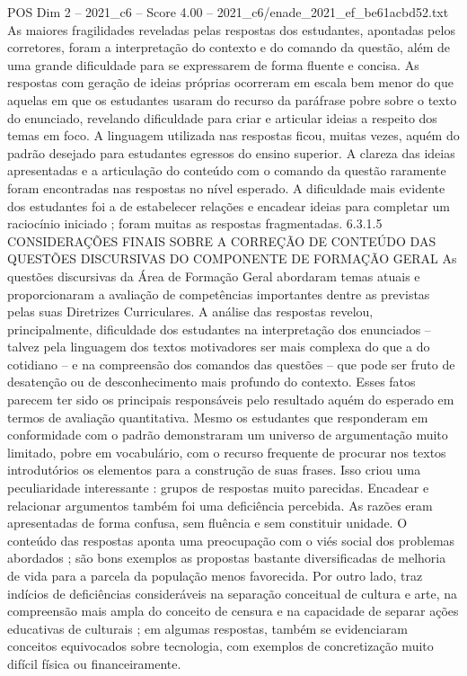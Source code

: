 \begin{textsample}{POS Dim 2 – 2021\_c6 – Score 4.00 – 2021\_c6/enade\_2021\_ef\_be61acbd52.txt}
As maiores fragilidades reveladas pelas respostas dos estudantes, apontadas pelos corretores, foram a interpretação do contexto e do comando da questão, além de uma grande dificuldade para se expressarem de forma fluente e concisa.
As respostas com geração de ideias próprias ocorreram em escala bem menor do que aquelas em que os estudantes usaram do recurso da paráfrase pobre sobre o texto do enunciado, revelando dificuldade para criar e articular ideias a respeito dos temas em foco.
A linguagem utilizada nas respostas ficou, muitas vezes, aquém do padrão desejado para estudantes egressos do ensino superior.
A clareza das ideias apresentadas e a articulação do conteúdo com o comando da questão raramente foram encontradas nas respostas no nível esperado.
A dificuldade mais evidente dos estudantes foi a de estabelecer relações e encadear ideias para completar um raciocínio iniciado ; foram muitas as respostas fragmentadas. 6.3.1.5 CONSIDERAÇÕES FINAIS SOBRE A CORREÇÃO DE CONTEÚDO DAS QUESTÕES DISCURSIVAS DO COMPONENTE DE FORMAÇÃO GERAL As questões discursivas da Área de Formação Geral abordaram temas atuais e proporcionaram a avaliação de competências importantes dentre as previstas pelas suas Diretrizes Curriculares.
A análise das respostas revelou, principalmente, dificuldade dos estudantes na interpretação dos enunciados – talvez pela linguagem dos textos motivadores ser mais complexa do que a do cotidiano – e na compreensão dos comandos das questões – que pode ser fruto de desatenção ou de desconhecimento mais profundo do contexto.
Esses fatos parecem ter sido os principais responsáveis pelo resultado aquém do esperado em termos de avaliação quantitativa.
Mesmo os estudantes que responderam em conformidade com o padrão demonstraram um universo de argumentação muito limitado, pobre em vocabulário, com o recurso frequente de procurar nos textos introdutórios os elementos para a construção de suas frases.
Isso criou uma peculiaridade interessante : grupos de respostas muito parecidas.
Encadear e relacionar argumentos também foi uma deficiência percebida.
As razões eram apresentadas de forma confusa, sem fluência e sem constituir unidade.
O conteúdo das respostas aponta uma preocupação com o viés social dos problemas abordados ; são bons exemplos as propostas bastante diversificadas de melhoria de vida para a parcela da população menos favorecida.
Por outro lado, traz indícios de deficiências consideráveis na separação conceitual de cultura e arte, na compreensão mais ampla do conceito de censura e na capacidade de separar ações educativas de culturais ; em algumas respostas, também se evidenciaram conceitos equivocados sobre tecnologia, com exemplos de concretização muito difícil física ou financeiramente.

\end{textsample}
